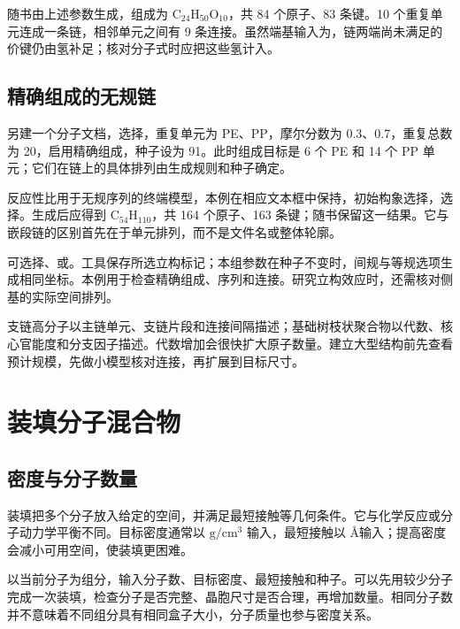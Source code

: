 随书由上述参数生成，组成为 $\mathrm{C_{24}H_{50}O_{10}}$，共 84 个原子、83 条键。10 个重复单元连成一条链，相邻单元之间有 9 条连接。虽然端基输入为，链两端尚未满足的价键仍由氢补足；核对分子式时应把这些氢计入。



\subsection{精确组成的无规链}

另建一个分子文档，选择，重复单元为 PE、PP，摩尔分数为 0.3、0.7，重复总数为 20，启用精确组成，种子设为 91。此时组成目标是 6 个 PE 和 14 个 PP 单元；它们在链上的具体排列由生成规则和种子确定。

反应性比用于无规序列的终端模型，本例在相应文本框中保持，初始构象选择，选择。生成后应得到 $\mathrm{C_{54}H_{110}}$，共 164 个原子、163 条键；随书保留这一结果。它与嵌段链的区别首先在于单元排列，而不是文件名或整体轮廓。

可选择、或。工具保存所选立构标记；本组参数在种子不变时，间规与等规选项生成相同坐标。本例用于检查精确组成、序列和连接。研究立构效应时，还需核对侧基的实际空间排列。

支链高分子以主链单元、支链片段和连接间隔描述；基础树枝状聚合物以代数、核心官能度和分支因子描述。代数增加会很快扩大原子数量。建立大型结构前先查看预计规模，先做小模型核对连接，再扩展到目标尺寸。

\section{装填分子混合物}

\subsection{密度与分子数量}

装填把多个分子放入给定的空间，并满足最短接触等几何条件。它与化学反应或分子动力学平衡不同。目标密度通常以 $\mathrm{g/cm^3}$ 输入，最短接触以 \AA 输入；提高密度会减小可用空间，使装填更困难。

以当前分子为组分，输入分子数、目标密度、最短接触和种子。可以先用较少分子完成一次装填，检查分子是否完整、晶胞尺寸是否合理，再增加数量。相同分子数并不意味着不同组分具有相同盒子大小，分子质量也参与密度关系。

